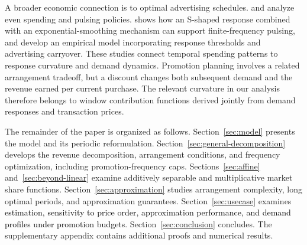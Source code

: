 A broader economic connection is to optimal advertising schedules. \citet{sasieni1971advertising} and \citet{mahajan1986pulsing} analyze even spending and pulsing policies. \citet{feinberg1992pulsing} shows how an S-shaped response combined with an exponential-smoothing mechanism can support finite-frequency pulsing, and \citet{dube2005advertising} develop an empirical model incorporating response thresholds and advertising carryover. These studies connect temporal spending patterns to response curvature and demand dynamics. Promotion planning involves a related arrangement tradeoff, but a discount changes both subsequent demand and the revenue earned per current purchase. The relevant curvature in our analysis therefore belongs to window contribution functions derived jointly from demand responses and transaction prices.
\par\endgroup

The remainder of the paper is organized as follows. Section~\ref{sec:model} presents the model and its periodic reformulation. Section~\ref{sec:general-decomposition} develops the revenue decomposition, arrangement conditions, and frequency optimization, including promotion-frequency caps. Sections~\ref{sec:affine} and~\ref{sec:beyond-linear} examine additively separable and multiplicative market share functions. Section~\ref{sec:approximation} studies arrangement complexity, long optimal periods, and approximation guarantees. Section~\ref{sec:usecase} examines \textcolor{black}{estimation, sensitivity to price order, approximation performance, and demand profiles under promotion budgets}. Section~\ref{sec:conclusion} concludes. The supplementary appendix contains additional proofs and numerical results.
